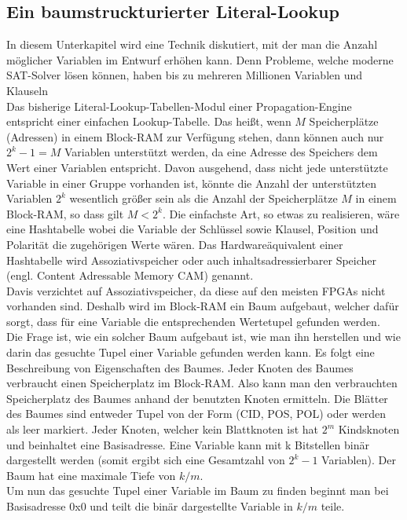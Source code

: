 \subsection{Ein baumstruckturierter Literal-Lookup}
\label{treelookup}
In diesem Unterkapitel wird eine Technik diskutiert,
mit der man die Anzahl möglicher Variablen im 
Entwurf erhöhen kann. Denn Probleme, welche moderne
SAT-Solver lösen können, haben bis zu mehreren 
Millionen Variablen und Klauseln\\
Das bisherige Literal-Lookup-Tabellen-Modul einer Propagation-Engine
entspricht einer einfachen Lookup-Tabelle. Das heißt,
wenn $M$ Speicherplätze (Adressen) in einem Block-RAM zur
Verfügung stehen, dann können auch nur $2^k-1 = M$ Variablen unterstützt werden,
da eine Adresse des Speichers dem Wert einer Variablen entspricht. 
Davon ausgehend, dass nicht jede unterstützte Variable in einer Gruppe vorhanden
ist, könnte die Anzahl der unterstützten Variablen $2^k$ wesentlich 
größer sein als die Anzahl der Speicherplätze $M$ in einem
Block-RAM, so dass gilt $M < 2^k$. Die einfachste Art, so etwas zu realisieren, wäre
eine Hashtabelle wobei die Variable der Schlüssel sowie Klausel, Position und
Polarität die zugehörigen Werte wären. Das Hardwareäquivalent einer Hashtabelle
wird Assoziativspeicher oder auch inhaltsadressierbarer Speicher 
(engl. Content Adressable Memory CAM) genannt.\\
Davis \cite{davis:2008} verzichtet auf Assoziativspeicher, da
diese auf den meisten FPGAs nicht vorhanden sind. Deshalb 
wird im Block-RAM ein Baum aufgebaut, welcher dafür sorgt, dass
für eine Variable die entsprechenden Wertetupel gefunden werden.\\
Die Frage ist, wie ein solcher Baum aufgebaut ist, wie
man ihn herstellen und wie darin das gesuchte Tupel
einer Variable gefunden werden kann. Es folgt eine Beschreibung
von Eigenschaften des Baumes.
Jeder Knoten des Baumes verbraucht einen Speicherplatz im Block-RAM.
Also kann man den verbrauchten Speicherplatz des Baumes anhand der
benutzten Knoten ermitteln.
Die Blätter des Baumes sind entweder Tupel von der Form (CID, POS, POL)
oder werden als leer markiert. 
Jeder Knoten, welcher kein Blattknoten ist hat $2^m$ Kindsknoten und beinhaltet eine Basisadresse. 
Eine Variable kann mit k Bitstellen binär dargestellt werden (somit ergibt sich eine Gesamtzahl
von $2^k-1$ Variablen). Der Baum hat eine maximale Tiefe von $k/m$.\\
Um nun das gesuchte Tupel einer Variable im Baum zu finden 
beginnt man bei Basisadresse 0x0 und teilt die binär dargestellte Variable in $k/m$ teile.
